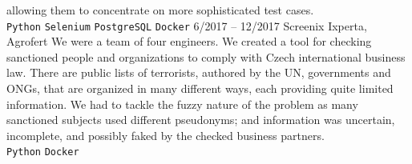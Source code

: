 \documentclass[10pt,A4]{article}
\begin{document}
\begin{entrylist}
{			allowing them to concentrate on more sophisticated test cases. 
			\\ 
			\texttt{Python}\slashsep
			\texttt{Selenium}\slashsep
			\texttt{PostgreSQL}\slashsep
			\texttt{Docker}
		}
		\entry
		{6/2017 -- 12/2017}
		{Screenix}
		{Ixperta, Agrofert}
		{We were a team of four engineers. We created a tool for checking sanctioned people
			and organizations to comply with Czech international business law. There are public
			lists of terrorists, authored by the UN, governments and ONGs, that are organized in
			many different ways, each providing quite limited information. We had to tackle the
			fuzzy nature of the problem as many sanctioned subjects used different pseudonyms;
			and information was uncertain, incomplete, and possibly faked by the checked
			business partners.
			\\ 
			\texttt{Python}\slashsep
			\texttt{Docker}
		}
	\end{entrylist}
	
	
	
	\vfill
\end{document}
